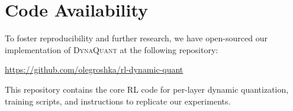 \documentclass{article}
\begin{document}
    \section{Code Availability}
    \label{sec:code-availability}
    
    To foster reproducibility and further research, 
    we have open-sourced our implementation of 
    \textsc{DynaQuant} at the following repository:
    
    \url{https://github.com/olegroshka/rl-dynamic-quant}
    
    This repository contains the core RL code for per-layer dynamic quantization, 
    training scripts, and instructions to replicate our experiments.
    	
	
	\balance
	
	
	
	\clearpage
	\appendix
	
\end{document}
